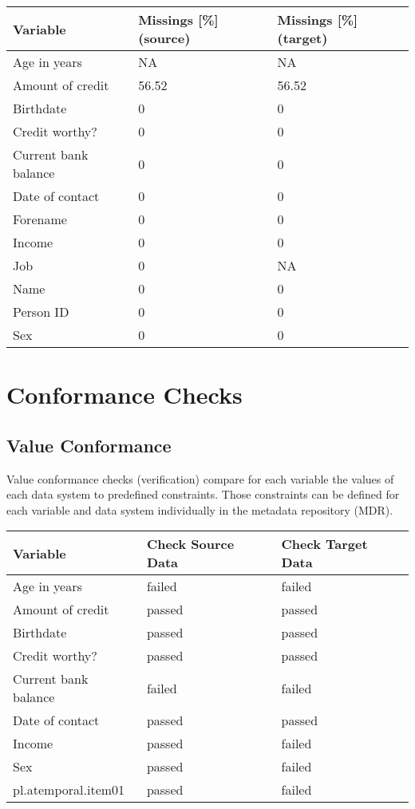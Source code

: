 \documentclass[
]{article}
\begin{document}
\begin{table}[H]
\centering
\begin{tabular}{l|l|l}
\hline
\textbf{Variable} & \textbf{Missings [\%] (source)} & \textbf{Missings [\%] (target)}\\
\hline
Age in years & NA & NA\\
\hline
Amount of credit & 56.52 & 56.52\\
\hline
Birthdate & 0 & 0\\
\hline
Credit worthy? & 0 & 0\\
\hline
Current bank balance & 0 & 0\\
\hline
Date of contact & 0 & 0\\
\hline
Forename & 0 & 0\\
\hline
Income & 0 & 0\\
\hline
Job & 0 & NA\\
\hline
Name & 0 & 0\\
\hline
Person ID & 0 & 0\\
\hline
Sex & 0 & 0\\
\hline
\end{tabular}
\end{table}

\newpage

\hypertarget{conformance-checks}{%
\section{Conformance Checks}\label{conformance-checks}}

\hypertarget{value-conformance}{%
\subsection{Value Conformance}\label{value-conformance}}

Value conformance checks (verification) compare for each variable the
values of each data system to predefined constraints. Those constraints
can be defined for each variable and data system individually in the
metadata repository (MDR).

\begin{table}[H]
\centering
\begin{tabular}{l|l|l}
\hline
\textbf{Variable} & \textbf{Check Source Data} & \textbf{Check Target Data}\\
\hline
Age in years & failed & failed\\
\hline
Amount of credit & passed & passed\\
\hline
Birthdate & passed & passed\\
\hline
Credit worthy? & passed & passed\\
\hline
Current bank balance & failed & failed\\
\hline
Date of contact & passed & passed\\
\hline
Income & passed & failed\\
\hline
Sex & passed & failed\\
\hline
pl.atemporal.item01 & passed & failed\\
\hline
\end{tabular}
\end{table}
\end{document}
